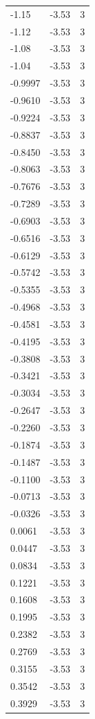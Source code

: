 \begin{longtable}{lrr}
  -1.15 & -3.53 & 3 \\
  -1.12 & -3.53 & 3 \\
  -1.08 & -3.53 & 3 \\
  -1.04 & -3.53 & 3 \\
  -0.9997 & -3.53 & 3 \\
  -0.9610 & -3.53 & 3 \\
  -0.9224 & -3.53 & 3 \\
  -0.8837 & -3.53 & 3 \\
  -0.8450 & -3.53 & 3 \\
  -0.8063 & -3.53 & 3 \\
  -0.7676 & -3.53 & 3 \\
  -0.7289 & -3.53 & 3 \\
  -0.6903 & -3.53 & 3 \\
  -0.6516 & -3.53 & 3 \\
  -0.6129 & -3.53 & 3 \\
  -0.5742 & -3.53 & 3 \\
  -0.5355 & -3.53 & 3 \\
  -0.4968 & -3.53 & 3 \\
  -0.4581 & -3.53 & 3 \\
  -0.4195 & -3.53 & 3 \\
  -0.3808 & -3.53 & 3 \\
  -0.3421 & -3.53 & 3 \\
  -0.3034 & -3.53 & 3 \\
  -0.2647 & -3.53 & 3 \\
  -0.2260 & -3.53 & 3 \\
  -0.1874 & -3.53 & 3 \\
  -0.1487 & -3.53 & 3 \\
  -0.1100 & -3.53 & 3 \\
  -0.0713 & -3.53 & 3 \\
  -0.0326 & -3.53 & 3 \\
  0.0061 & -3.53 & 3 \\
  0.0447 & -3.53 & 3 \\
  0.0834 & -3.53 & 3 \\
  0.1221 & -3.53 & 3 \\
  0.1608 & -3.53 & 3 \\
  0.1995 & -3.53 & 3 \\
  0.2382 & -3.53 & 3 \\
  0.2769 & -3.53 & 3 \\
  0.3155 & -3.53 & 3 \\
  0.3542 & -3.53 & 3 \\
  0.3929 & -3.53 & 3 \\

\end{longtable}
